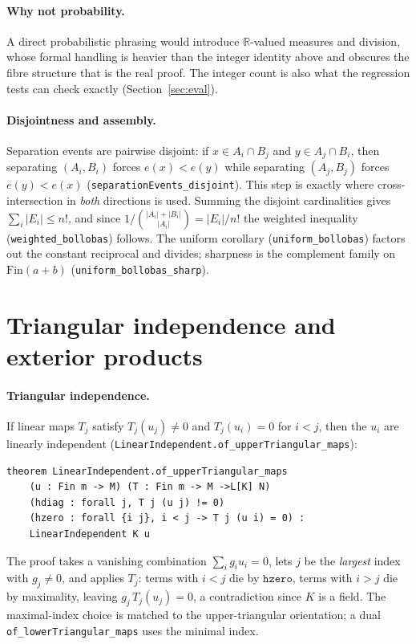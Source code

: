 \documentclass[11pt]{article}
\newcommand{\bind}[2]{\binom{#1}{#2}}
\begin{document}
\paragraph{Why not probability.} A direct probabilistic phrasing would introduce
$\mathbb{R}$-valued measures and division, whose formal handling is heavier than the
integer identity above and obscures the fibre structure that is the real proof. The
integer count is also what the regression tests can check exactly
(Section~\ref{sec:eval}).

\paragraph{Disjointness and assembly.} Separation events are pairwise disjoint: if
$x\in A_i\cap B_j$ and $y\in A_j\cap B_i$, then separating $(A_i,B_i)$ forces
$e(x)<e(y)$ while separating $(A_j,B_j)$ forces $e(y)<e(x)$
(\lstinline{separationEvents_disjoint}). This step is exactly where cross-intersection
in \emph{both} directions is used. Summing the disjoint cardinalities gives
$\sum_i|E_i|\le n!$, and since $1/\bind{|A_i|+|B_i|}{|A_i|}=|E_i|/n!$ the weighted
inequality (\lstinline{weighted_bollobas}) follows. The uniform corollary
(\lstinline{uniform_bollobas}) factors out the constant reciprocal and divides;
sharpness is the complement family on $\mathrm{Fin}(a+b)$
(\lstinline{uniform_bollobas_sharp}).

\section{Triangular independence and exterior products}\label{sec:ext}

\paragraph{Triangular independence.} If linear maps $T_j$ satisfy $T_j(u_j)\neq0$ and
$T_j(u_i)=0$ for $i<j$, then the $u_i$ are linearly independent
(\lstinline{LinearIndependent.of_upperTriangular_maps}):
\begin{verbatim}
theorem LinearIndependent.of_upperTriangular_maps
    (u : Fin m -> M) (T : Fin m -> M ->L[K] N)
    (hdiag : forall j, T j (u j) != 0)
    (hzero : forall {i j}, i < j -> T j (u i) = 0) :
    LinearIndependent K u
\end{verbatim}
The proof takes a vanishing combination $\sum_i g_i u_i=0$, lets $j$ be the
\emph{largest} index with $g_j\neq0$, and applies $T_j$: terms with $i<j$ die by
$\mathtt{hzero}$, terms with $i>j$ die by maximality, leaving $g_j\,T_j(u_j)=0$, a
contradiction since $K$ is a field. The maximal-index choice is matched to the
upper-triangular orientation; a dual \lstinline{of_lowerTriangular_maps} uses the
minimal index.
\end{document}
